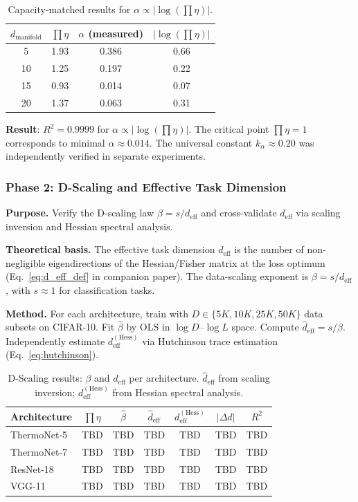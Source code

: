\documentclass[11pt, a4paper]{article}
\theoremstyle{definition}
\begin{document}
\begin{table}[htbp]
\centering
\caption{Capacity-matched results for $\alpha \propto |\log(\prod\eta)|$.}
\label{tab:log_scaling}
\begin{tabular}{@{}cccc@{}}
\toprule
$d_{\text{manifold}}$ & $\prod\eta$ & $\alpha$ (measured) & $|\log(\prod\eta)|$ \\
\midrule
5  & 1.93 & 0.386 & 0.66 \\
10 & 1.25 & 0.197 & 0.22 \\
15 & 0.93 & 0.014 & 0.07 \\
20 & 1.37 & 0.063 & 0.31 \\
\bottomrule
\end{tabular}
\end{table}

\textbf{Result}: $R^2 = 0.9999$ for $\alpha \propto |\log(\prod\eta)|$. The critical point $\prod\eta = 1$ corresponds to minimal $\alpha \approx 0.014$. The universal constant $k_\alpha \approx 0.20$ was independently verified in separate experiments.

\subsubsection{Phase 2: D-Scaling and Effective Task Dimension}

\textbf{Purpose.} Verify the D-scaling law $\beta = s / d_{\mathrm{eff}}$ and cross-validate $d_{\mathrm{eff}}$ via scaling inversion and Hessian spectral analysis.

\textbf{Theoretical basis.} The effective task dimension $d_{\mathrm{eff}}$ is the number of non-negligible eigendirections of the Hessian/Fisher matrix at the loss optimum (Eq.~\ref{eq:d_eff_def} in companion paper). The data-scaling exponent is $\beta = s / d_{\mathrm{eff}}$, with $s \approx 1$ for classification tasks.

\textbf{Method.} For each architecture, train with $D \in \{5K, 10K, 25K, 50K\}$ data subsets on CIFAR-10. Fit $\hat{\beta}$ by OLS in $\log D$--$\log L$ space. Compute $\hat{d}_{\mathrm{eff}} = s / \hat{\beta}$. Independently estimate $d_{\mathrm{eff}}^{\mathrm{(Hess)}}$ via Hutchinson trace estimation (Eq.~\ref{eq:hutchinson}).

\begin{table}[htbp]
\centering
\caption{D-Scaling results: $\beta$ and $d_{\mathrm{eff}}$ per architecture. $\hat{d}_{\mathrm{eff}}$ from scaling inversion; $d_{\mathrm{eff}}^{\mathrm{(Hess)}}$ from Hessian spectral analysis.}
\label{tab:d_scaling}
\begin{tabular}{@{}lcccccc@{}}
\toprule
Architecture & $\prod\eta$ & $\hat{\beta}$ & $\hat{d}_{\mathrm{eff}}$ & $d_{\mathrm{eff}}^{\mathrm{(Hess)}}$ & $|\Delta d|$ & $R^2$ \\
\midrule
ThermoNet-5   & TBD & TBD & TBD & TBD & TBD & TBD \\
ThermoNet-7   & TBD & TBD & TBD & TBD & TBD & TBD \\
ResNet-18     & TBD & TBD & TBD & TBD & TBD & TBD \\
VGG-11        & TBD & TBD & TBD & TBD & TBD & TBD \\
\bottomrule
\end{tabular}
\end{table}
\end{document}
